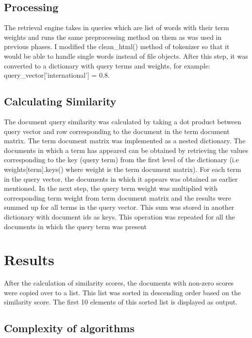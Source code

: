 \documentclass[paper=a4, fontsize=11pt]{scrartcl}
\numberwithin{equation}{section}		%
\numberwithin{figure}{section}			%
\numberwithin{table}{section}				%
\begin{document}
\subsection{Processing}

The retrieval engine takes in queries which are list of words with their term weights and runs the same preprocessing method on them as was used in previous phases. I modified the clean_html() method of tokenizer so that it would be able to handle single words instead of file objects. After this step, it was converted to a dictionary with query terms and weights, for example: query_vector['international'] = 0.8.  

\subsection{Calculating Similarity}

The document query similarity was calculated by taking a dot product between query vector and row corresponding to the document in the term document matrix. The term document matrix was implemented as a nested dictionary. The documents in which a term has appeared can be obtained by retrieving the values corresponding to the key (query term) from the first level of the dictionary (i.e weights[term].keys() where weight is the term document matrix). For each term in the query vector, the documents in which it appears was obtained as earlier mentioned. In the next step, the query term weight was multiplied with corresponding term weight from term document matrix and the results were summed up for all terms in the query vector. This sum was stored in another dictionary with document ids as keys. This operation was repeated for all the documents in which the query term was present

\section{Results}

After the calculation of similarity scores, the documents with non-zero scores were copied over to a list. This list was sorted in descending order based on the similarity score. The first 10 elements of this sorted list is displayed as output.  

\subsection{Complexity of algorithms}
\end{document}
